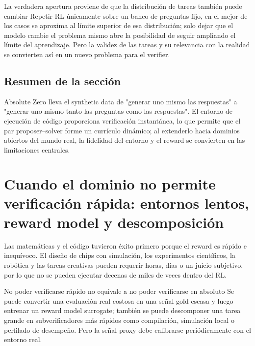 \documentclass[a4paper]{article}
\begin{document}
\begin{importantbox}{La verdadera apertura proviene de que la distribución de tareas también puede cambiar}
Repetir RL únicamente sobre un banco de preguntas fijo, en el mejor de los casos se aproxima al límite superior de esa distribución; solo dejar que el modelo cambie el problema mismo abre la posibilidad de seguir ampliando el límite del aprendizaje. Pero la validez de las tareas y su relevancia con la realidad se convierten así en un nuevo problema para el verifier.
\end{importantbox}

\subsection{Resumen de la sección}

Absolute Zero lleva el synthetic data de "generar uno mismo las respuestas" a "generar uno mismo tanto las preguntas como las respuestas". El entorno de ejecución de código proporciona verificación instantánea, lo que permite que el par proposer--solver forme un currículo dinámico; al extenderlo hacia dominios abiertos del mundo real, la fidelidad del entorno y el reward se convierten en las limitaciones centrales.
\section{Cuando el dominio no permite verificación rápida: entornos lentos, reward model y descomposición}


Las matemáticas y el código tuvieron éxito primero porque el reward es rápido e inequívoco. El diseño de chips con simulación, los experimentos científicos, la robótica y las tareas creativas pueden requerir horas, días o un juicio subjetivo, por lo que no se pueden ejecutar decenas de miles de veces dentro del RL.

\begin{importantbox}{No poder verificarse rápido no equivale a no poder verificarse en absoluto}
Se puede convertir una evaluación real costosa en una señal gold escasa y luego entrenar un reward model surrogate; también se puede descomponer una tarea grande en subverificadores más rápidos como compilación, simulación local o perfilado de desempeño. Pero la señal proxy debe calibrarse periódicamente con el entorno real.
\end{importantbox}
\end{document}
